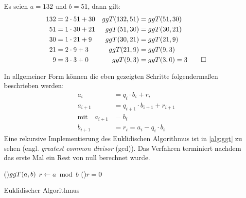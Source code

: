 \begin{example}
  Es seien $a=132$ und $b=51$, dann gilt:
  \begin{align*}
    132 & = 2 \cdot 51 + 30 & ggT(132,51) & = ggT(51,30)            \\
    51  & = 1 \cdot 30 + 21 & ggT(51,30)  & = ggT(30,21)            \\
    30  & = 1 \cdot 21 + 9  & ggT(30,21)  & = ggT(21,9)             \\
    21  & = 2 \cdot 9 + 3   & ggT(21,9)   & = ggT(9,3)              \\
    9   & = 3 \cdot 3 + 0   & ggT(9,3)    & = ggT(3,0) = 3 \qedhere
  \end{align*}
\end{example}
\noindent
In allgemeiner Form können die eben gezeigten Schritte folgendermaßen beschrieben werden:
\begin{equation}
  \label{eq:euklid}
  \begin{split}
    a_i     & = q_i \cdot b_i + r_i \\
    a_{i+1} & = q_{i+1} \cdot b_{i+1} + r_{i+1} \\
    \text{mit} \quad a_{i+1} & = b_i \\
    b_{i+1} & = r_i = a_i - q_i \cdot b_i
  \end{split}
\end{equation}
Eine rekursive Implementierung des Euklidischen Algorithmus ist in \autoref{alg:ggt}
zu sehen (engl. \textit{greatest common divisor} (gcd)).
Das Verfahren terminiert nachdem das erste Mal ein Rest von null berechnet wurde.
\begin{singlespace}
  \begin{algorithm}
    \DontPrintSemicolon
    \BlankLine
    \Fn(){$ggT(a,b)$}{
      $r \leftarrow a \bmod{b}$\;
      \If(){$r = 0$}{
      }
    }
    \caption{Euklidischer Algorithmus}
    \label{alg:ggt}
  \end{algorithm}
\end{singlespace}

